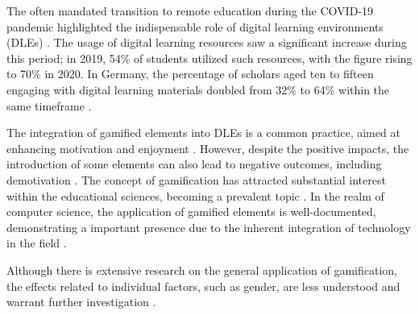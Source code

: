 
The often mandated transition to remote education during the COVID-19 pandemic highlighted the indispensable role of digital learning environments (DLEs) \parencite{garcia-moralesTransformationHigherEducation2021}.
The usage of digital learning resources saw a significant increase during this period; in 2019, 54\% of students utilized such resources, with the figure rising to 70\% in 2020.
In Germany, the percentage of scholars aged ten to fifteen engaging with digital learning materials doubled from 32\% to 64\% within the same timeframe \parencite{pressestelledesstatistischenbundesamtsDigitalesLernenNimmt2020}.

The integration of gamified elements into DLEs is a common practice, aimed at enhancing motivation and enjoyment \parencite{gonzalezGamificationIntelligentTutoring2014, jacksonMotivationPerformanceGamebased2013}.
However, despite the positive impacts, the introduction of some elements can also lead to negative outcomes, including demotivation \parencite{almeidaSystematicMappingNegative2021}.
The concept of gamification has attracted substantial interest within the educational sciences, becoming a prevalent topic \parencite{swachaStateResearchGamification2021}.
In the realm of computer science, the application of gamified elements is well-documented, demonstrating a important presence due to the inherent integration of technology in the field \parencite{dichevGamifyingEducationWhat2017}.

Although there is extensive research on the general application of gamification, the effects related to individual factors, such as gender, are less understood and warrant further investigation \parencite{dehghanzadehUsingGamificationSupport2024, oliveiraTailoredGamificationEducation2023}.


